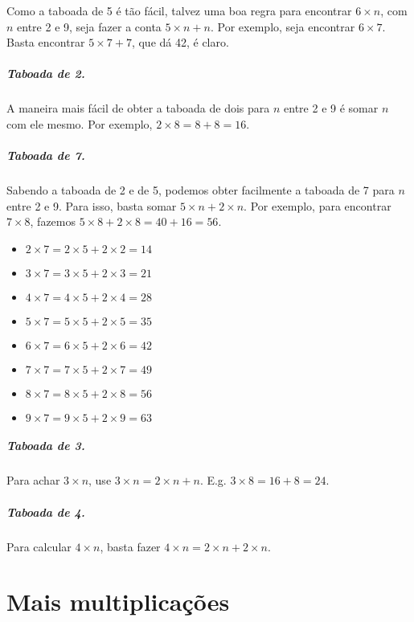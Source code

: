 \documentclass[12pt]{book}
\begin{document}
Como a taboada de 5 é tão fácil, talvez uma boa regra
para encontrar $6\times n$, com $n$ entre 2 e 9, seja
fazer a conta $5\times n + n$. Por exemplo, seja
encontrar $6\times 7$. Basta encontrar $5\times 7 + 7$,
que dá 42, é claro.

\paragraph{Taboada de 2.} A maneira mais fácil de 
obter a taboada de dois para $n$ entre 2 e 9 é somar
$n$ com ele mesmo. Por exemplo, $2\times 8= 8+8= 16$.

\paragraph{Taboada de 7.}
Sabendo a taboada de 2 e de 5, podemos obter facilmente
a taboada de 7 para $n$ entre 2 e 9. Para isso, 
basta somar $5\times n + 2\times n$. Por exemplo,
para encontrar $7\times 8$,
fazemos $5\times 8 + 2\times 8= 40+16= 56$.
\begin{itemize}
\item $2\times 7= 2\times 5 + 2\times 2= 14$
\item $3\times 7= 3\times 5 + 2\times 3= 21$
\item $4\times 7= 4\times 5 + 2\times 4= 28$
\item $5\times 7= 5\times 5 + 2\times 5= 35$
\item $6\times 7= 6\times 5 + 2\times 6= 42$
\item $7\times 7= 7\times 5 + 2\times 7= 49$
\item $8\times 7= 8\times 5 + 2\times 8= 56$
\item $9\times 7= 9\times 5 + 2\times 9= 63$
\end{itemize}


\paragraph{Taboada de 3.} Para achar $3\times n$,
use $3\times n= 2\times n + n$.
E.g. $3\times 8= 16+8= 24$.

\paragraph{Taboada de 4.}
Para calcular $4\times n$,  basta fazer
$4\times n= 2\times n + 2\times n$.

\chapter{Mais multiplicações}
\end{document}
